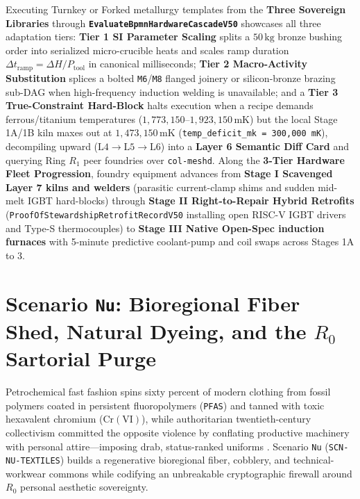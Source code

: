 Executing Turnkey or Forked metallurgy templates from the \textbf{Three Sovereign Libraries} through \textbf{\texttt{EvaluateBpmnHardwareCascadeV50}}
showcases all three adaptation tiers: \textbf{Tier 1 SI Parameter Scaling} splits a $50\,\mathrm{kg}$ bronze bushing order into serialized micro-crucible
heats and scales ramp duration $\Delta t_{\mathrm{ramp}} = \Delta H / P_{\mathrm{tool}}$ in canonical milliseconds; \textbf{Tier 2 Macro-Activity
Substitution} splices a bolted \texttt{M6}/\texttt{M8} flanged joinery or silicon-bronze brazing sub-DAG when high-frequency induction welding is
unavailable; and a \textbf{Tier 3 True-Constraint Hard-Block} halts execution when a recipe demands ferrous/titanium temperatures
($1{,}773{,}150\text{--}1{,}923{,}150\,\mathrm{mK}$) but the local Stage 1A/1B kiln maxes out at $1{,}473{,}150\,\mathrm{mK}$
(\texttt{temp\_deficit\_mk = 300,000 mK}), decompiling upward ($\mathrm{L4} \to \mathrm{L5} \to \mathrm{L6}$) into a \textbf{Layer 6 Semantic Diff
Card} and querying Ring $R_1$ peer foundries over \texttt{col-meshd}. Along the \textbf{3-Tier Hardware Fleet Progression}, foundry equipment advances from
\textbf{Stage I Scavenged Layer 7 kilns and welders} (parasitic current-clamp shims and sudden mid-melt IGBT hard-blocks) through \textbf{Stage II
Right-to-Repair Hybrid Retrofits} (\texttt{ProofOfStewardshipRetrofitRecordV50} installing open RISC-V IGBT drivers and Type-S thermocouples) to
\textbf{Stage III Native Open-Spec induction furnaces} with 5-minute predictive coolant-pump and coil swaps across Stages 1A to 3.

\section{Scenario \texttt{Nu}: Bioregional Fiber Shed, Natural Dyeing, and the $R_0$ Sartorial Purge}
\label{sec:scn-nu}

Petrochemical fast fashion spins sixty percent of modern clothing from fossil polymers coated in persistent fluoropolymers (\texttt{PFAS}) and
tanned with toxic hexavalent chromium ($\mathrm{Cr(VI)}$), while authoritarian twentieth-century collectivism committed the opposite violence by
conflating productive machinery with personal attire---imposing drab, status-ranked uniforms \parencite{illich1973,scott1998}. Scenario
\texttt{Nu} (\texttt{SCN-NU-TEXTILES}) builds a regenerative bioregional fiber, cobblery, and technical-workwear commons while codifying an
unbreakable cryptographic firewall around $R_0$ personal aesthetic sovereignty.

